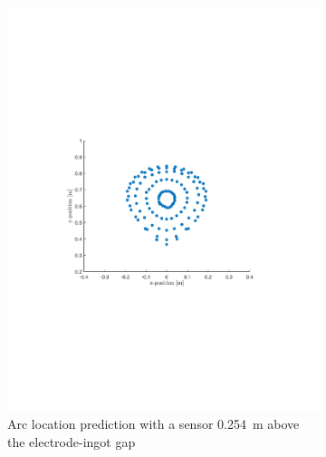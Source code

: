 \documentclass[onehalf,11pt]{beavtex}
\begin{document}
\begin{figure}[htbp]
\begin{subfigure}[b]{0.495\textwidth}
	\includegraphics[width=\textwidth]{sh3.pdf}
	\caption{Arc location prediction with a sensor \SI{0.254}{\meter} above the electrode-ingot gap}
	\end{subfigure}
	\hfill
	\begin{subfigure}[b]{0.495\textwidth}

\end{subfigure}
\end{figure}
\end{document}
